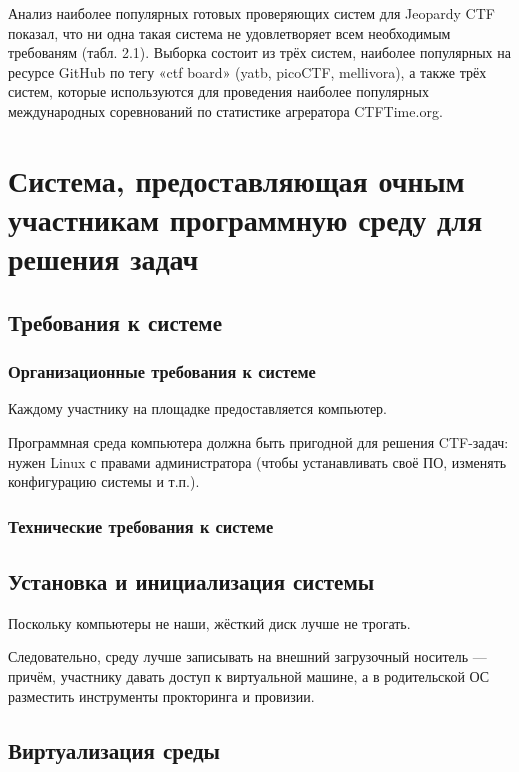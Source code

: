 Анализ наиболее популярных готовых проверяющих систем для Jeopardy CTF показал, что ни одна такая система не удовлетворяет всем необходимым требованям (табл. 2.1). Выборка состоит из трёх систем, наиболее популярных на ресурсе GitHub\cite{GithubCTFTag} по тегу «ctf board» (yatb, picoCTF, mellivora), а также трёх систем, которые используются для проведения наиболее популярных международных соревнований по статистике агрератора CTFTime.org\cite{CTFTime}.

\section{Система, предоставляющая очным участникам программную среду для решения задач}

\subsection{Требования к системе}

\subsubsection{Организационные требования к системе}

Каждому участнику на площадке предоставляется компьютер.

Программная среда компьютера должна быть пригодной для решения CTF-задач: нужен Linux с правами администратора (чтобы устанавливать своё ПО, изменять конфигурацию системы и т.п.).

\subsubsection{Технические требования к системе}

\subsection{Установка и инициализация системы}

Поскольку компьютеры не наши, жёсткий диск лучше не трогать.

Следовательно, среду лучше записывать на внешний загрузочный носитель — причём, участнику давать доступ к виртуальной машине, а в родительской ОС разместить инструменты прокторинга и провизии.

\subsection{Виртуализация среды}

